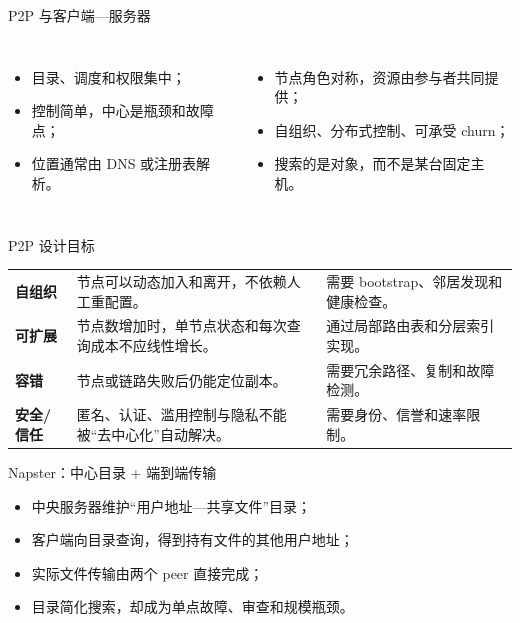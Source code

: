 \documentclass[UTF8,fontset=none,aspectratio=169,10pt]{beamer}
\begin{document}
\begin{frame}{P2P 与客户端—服务器}
\begin{columns}[T,onlytextwidth]
\begin{itemize}
  \item 目录、调度和权限集中；
  \item 控制简单，中心是瓶颈和故障点；
  \item 位置通常由 DNS 或注册表解析。
\end{itemize}
\begin{itemize}
  \item 节点角色对称，资源由参与者共同提供；
  \item 自组织、分布式控制、可承受 churn；
  \item 搜索的是对象，而不是某台固定主机。
\end{itemize}
\end{columns}
\end{frame}

\begin{frame}{P2P 设计目标}
\begin{tabularx}{\linewidth}{>{\bfseries}p{3cm}XX}
\toprule
自组织 & 节点可以动态加入和离开，不依赖人工重配置。 & 需要 bootstrap、邻居发现和健康检查。 \\
可扩展 & 节点数增加时，单节点状态和每次查询成本不应线性增长。 & 通过局部路由表和分层索引实现。 \\
容错 & 节点或链路失败后仍能定位副本。 & 需要冗余路径、复制和故障检测。 \\
安全/信任 & 匿名、认证、滥用控制与隐私不能被“去中心化”自动解决。 & 需要身份、信誉和速率限制。 \\
\bottomrule
\end{tabularx}
\end{frame}

\begin{frame}{Napster：中心目录 + 端到端传输}
\begin{itemize}
  \item 中央服务器维护“用户地址—共享文件”目录；
  \item 客户端向目录查询，得到持有文件的其他用户地址；
  \item 实际文件传输由两个 peer 直接完成；
  \item 目录简化搜索，却成为单点故障、审查和规模瓶颈。
\end{itemize}
\begin{center}
\end{center}
\end{frame}
\end{document}
